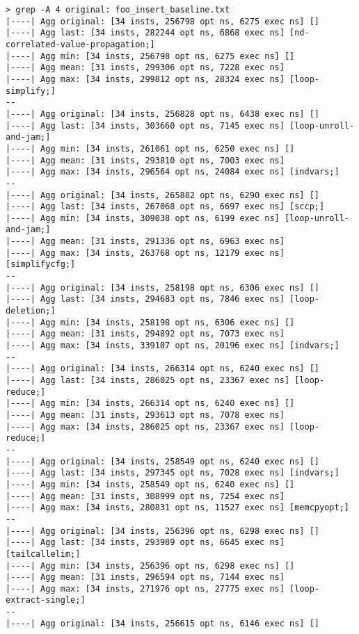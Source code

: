 \documentclass{vldb}
\newcommand{\dbCode}[1]{{\sffamily\small \textbf{#1}}\xspace}
\begin{document}
\begin{lstlisting}[caption={Results of Query \dbCode{INSERT INTO foo VALUES (1)} with No Optimizations}, label={lst:simplenoopt}]
> grep -A 4 original: foo_insert_baseline.txt 
|----| Agg original: [34 insts, 256798 opt ns, 6275 exec ns] []
|----| Agg last: [34 insts, 282244 opt ns, 6868 exec ns] [nd-correlated-value-propagation;]
|----| Agg min: [34 insts, 256798 opt ns, 6275 exec ns] []
|----| Agg mean: [31 insts, 299306 opt ns, 7228 exec ns]
|----| Agg max: [34 insts, 299812 opt ns, 28324 exec ns] [loop-simplify;]
--
|----| Agg original: [34 insts, 256828 opt ns, 6438 exec ns] []
|----| Agg last: [34 insts, 303660 opt ns, 7145 exec ns] [loop-unroll-and-jam;]
|----| Agg min: [34 insts, 261061 opt ns, 6250 exec ns] []
|----| Agg mean: [31 insts, 293810 opt ns, 7003 exec ns]
|----| Agg max: [34 insts, 296564 opt ns, 24084 exec ns] [indvars;]
--
|----| Agg original: [34 insts, 265882 opt ns, 6290 exec ns] []
|----| Agg last: [34 insts, 267068 opt ns, 6697 exec ns] [sccp;]
|----| Agg min: [34 insts, 309038 opt ns, 6199 exec ns] [loop-unroll-and-jam;]
|----| Agg mean: [31 insts, 291336 opt ns, 6963 exec ns]
|----| Agg max: [34 insts, 263768 opt ns, 12179 exec ns] [simplifycfg;]
--
|----| Agg original: [34 insts, 258198 opt ns, 6306 exec ns] []
|----| Agg last: [34 insts, 294683 opt ns, 7846 exec ns] [loop-deletion;]
|----| Agg min: [34 insts, 258198 opt ns, 6306 exec ns] []
|----| Agg mean: [31 insts, 294892 opt ns, 7073 exec ns]
|----| Agg max: [34 insts, 339107 opt ns, 20196 exec ns] [indvars;]
--
|----| Agg original: [34 insts, 266314 opt ns, 6240 exec ns] []
|----| Agg last: [34 insts, 286025 opt ns, 23367 exec ns] [loop-reduce;]
|----| Agg min: [34 insts, 266314 opt ns, 6240 exec ns] []
|----| Agg mean: [31 insts, 293613 opt ns, 7078 exec ns]
|----| Agg max: [34 insts, 286025 opt ns, 23367 exec ns] [loop-reduce;]
--
|----| Agg original: [34 insts, 258549 opt ns, 6240 exec ns] []
|----| Agg last: [34 insts, 297345 opt ns, 7028 exec ns] [indvars;]
|----| Agg min: [34 insts, 258549 opt ns, 6240 exec ns] []
|----| Agg mean: [31 insts, 308999 opt ns, 7254 exec ns]
|----| Agg max: [34 insts, 280831 opt ns, 11527 exec ns] [memcpyopt;]
--
|----| Agg original: [34 insts, 256396 opt ns, 6298 exec ns] []
|----| Agg last: [34 insts, 293989 opt ns, 6645 exec ns] [tailcallelim;]
|----| Agg min: [34 insts, 256396 opt ns, 6298 exec ns] []
|----| Agg mean: [31 insts, 296594 opt ns, 7144 exec ns]
|----| Agg max: [34 insts, 271976 opt ns, 27775 exec ns] [loop-extract-single;]
--
|----| Agg original: [34 insts, 256615 opt ns, 6146 exec ns] []

\end{lstlisting}
\end{document}
